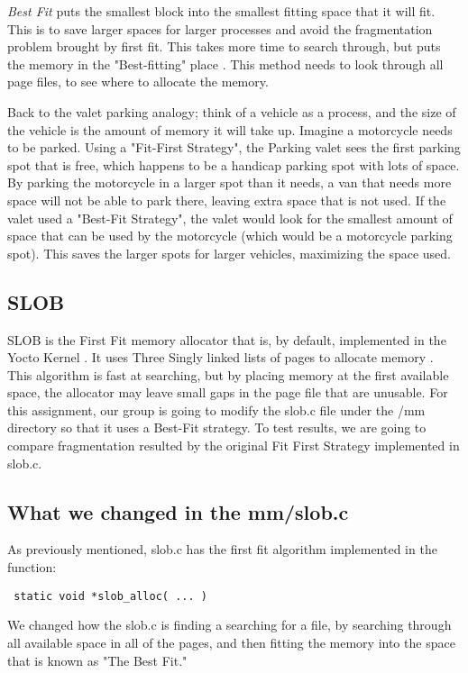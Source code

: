 \documentclass[onecolumn, draftclsnofoot,10pt, compsoc]{IEEEtran}
\begin{document}
        \textit{Best Fit} puts the smallest block into the smallest fitting space that it will fit. This is to save larger spaces for larger processes and avoid the fragmentation problem brought by first fit. This takes more time to search through, but puts the memory in the "Best-fitting" place \cite{bestFitting}. This method needs to look through all page files, to see where to allocate the memory.
        
        Back to the valet parking analogy; think of a vehicle as a process, and the size of the vehicle is the amount of memory it will take up. Imagine a motorcycle needs to be parked. Using a "Fit-First Strategy", the Parking valet sees the first parking spot that is free, which happens to be a handicap parking spot with lots of space. By parking the motorcycle in a larger spot than it needs, a van that needs more space will not be able to park there, leaving extra space that is not used.
        If the valet used a "Best-Fit Strategy", the valet would look for the smallest amount of space that can be used by the motorcycle (which would be a motorcycle parking spot). This saves the larger spots for larger vehicles, maximizing the space used.
        
        \subsection{SLOB}
        SLOB is the First Fit memory allocator that is, by default, implemented in the Yocto Kernel \cite{yoctoSLOB}. It uses Three Singly linked lists of pages to allocate memory \cite{breakingSLOBdemo}. This algorithm is fast at searching, but by placing memory at the first available space, the allocator may leave small gaps in the page file that are unusable.
        For this assignment, our group is going to modify the slob.c file under the /mm directory so that it uses a Best-Fit strategy. To test results, we are going to compare fragmentation resulted by the original Fit First Strategy implemented in slob.c. 
  
 \pagebreak
 \subsection{What we changed in the mm/slob.c}
 As previously mentioned, slob.c has the first fit algorithm implemented in the function: \begin{verbatim} static void *slob_alloc( ... ) \end{verbatim} 
 We changed how the slob.c is finding a searching for a file, by searching through all available space in all of the pages, and then fitting the memory into the space that is known as "The Best Fit."
        
\end{document}
